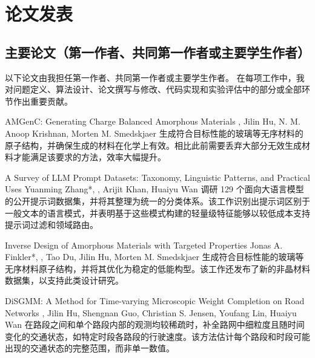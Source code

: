 \label{sec:publications}
\section*{论文发表}

\subsection*{主要论文（第一作者、共同第一作者或主要学生作者）}
以下论文由我担任第一作者、共同第一作者或主要学生作者。
在每项工作中，我对问题定义、算法设计、论文撰写与修改、代码实现和实验评估中的部分或全部环节作出重要贡献。

{AMGenC: Generating Charge Balanced Amorphous Materials}
{\me, Jilin Hu, N. M. Anoop Krishnan, Morten M. Smedskjaer}
{生成符合目标性能的玻璃等无序材料的原子结构，并确保生成的材料在化学上有效。相比此前需要丢弃大部分无效生成材料才能满足该要求的方法，效率大幅提升。}

{A Survey of LLM Prompt Datasets: Taxonomy, Linguistic Patterns, and Practical Uses}
{Yuanming Zhang*, \me*, Arijit Khan, Huaiyu Wan}
{调研 129 个面向大语言模型的公开提示词数据集，并将其整理为统一的分类体系。该工作识别出提示词区别于一般文本的语言模式，并表明基于这些模式构建的轻量级特征能够以较低成本支持提示词过滤和领域路由。}

{Inverse Design of Amorphous Materials with Targeted Properties}
{Jonas A. Finkler*, \me*, Tao Du, Jilin Hu, Morten M. Smedskjaer}
{生成符合目标性能的玻璃等无序材料原子结构，并将其优化为稳定的低能构型。该工作还发布了新的非晶材料数据集，以支持此类设计研究。}

{DiSGMM: A Method for Time-varying Microscopic Weight Completion on Road Networks}
{\me, Jilin Hu, Shengnan Guo, Christian S. Jensen, Youfang Lin, Huaiyu Wan}
{在路段之间和单个路段内部的观测均较稀疏时，补全路网中细粒度且随时间变化的交通状态，如特定时段各路段的行驶速度。该方法估计每个路段和时段可能出现的交通状态的完整范围，而非单一数值。}

